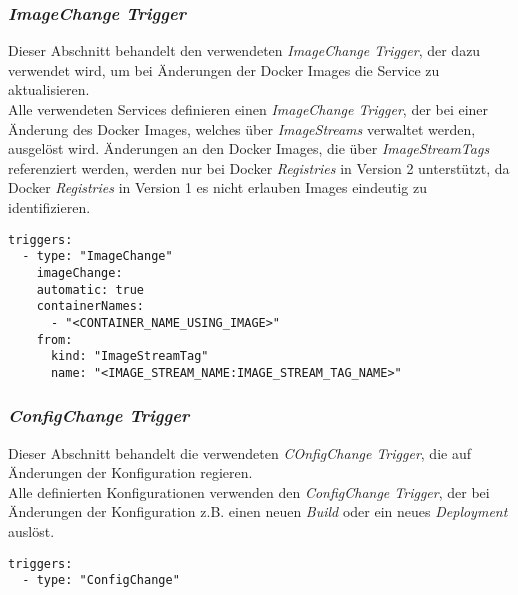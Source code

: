 \subsubsection{\emph{ImageChange Trigger}}
Dieser Abschnitt behandelt den verwendeten \emph{ImageChange Trigger}, der dazu verwendet wird, um bei Änderungen der Docker Images die Service zu aktualisieren.\\

Alle verwendeten Services definieren einen \emph{ImageChange Trigger}, der bei einer Änderung des Docker Images, welches über \emph{ImageStreams} verwaltet werden, ausgelöst wird. Änderungen an den Docker Images, die über \emph{ImageStreamTags} referenziert werden, werden nur bei Docker \emph{Registries} in Version 2 unterstützt, da Docker \emph{Registries} in Version 1 es nicht erlauben Images eindeutig zu identifizieren.
\begin{verbatim}
triggers:
  - type: "ImageChange"
    imageChange:
    automatic: true
    containerNames:
      - "<CONTAINER_NAME_USING_IMAGE>" 
    from:
      kind: "ImageStreamTag"
      name: "<IMAGE_STREAM_NAME:IMAGE_STREAM_TAG_NAME>"
\end{verbatim}

\subsubsection{\emph{ConfigChange Trigger}}
Dieser Abschnitt behandelt die verwendeten \emph{COnfigChange Trigger}, die auf Änderungen der Konfiguration regieren.\\

Alle definierten Konfigurationen verwenden den \emph{ConfigChange Trigger}, der bei Änderungen der Konfiguration z.B. einen neuen \emph{Build} oder ein neues \emph{Deployment} auslöst.
\begin{verbatim}
triggers:
  - type: "ConfigChange"
\end{verbatim}
